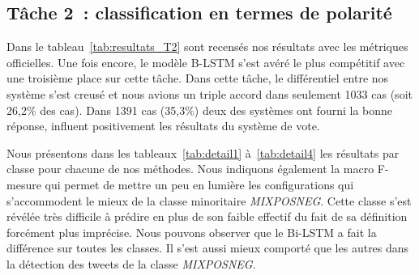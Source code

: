 \subsection{Tâche 2~: classification en termes de polarité}


Dans le tableau~\ref{tab:resultats_T2} sont recensés nos résultats avec les métriques officielles.
Une fois encore, le modèle B-LSTM s'est avéré le plus compétitif avec une troisième place sur cette tâche.
Dans cette tâche, le différentiel entre nos système s'est creusé et nous avions un triple accord dans seulement 1033 cas (soit 26,2\% des cas). Dans 1391 cas (35,3\%) deux des systèmes ont fourni la bonne réponse, influent positivement les résultats du système de vote.





Nous présentons dans les tableaux~\ref{tab:detail1} à~\ref{tab:detail4} les résultats par classe pour chacune de nos méthodes.
Nous indiquons également la macro F-mesure qui permet de mettre un peu en lumière les configurations qui s'accommodent le mieux de la classe minoritaire \emph{MIXPOSNEG}.
Cette classe s'est révélée très difficile à prédire en plus de son faible effectif du fait de sa définition forcément plus imprécise.
Nous pouvons observer que le Bi-LSTM a fait la différence sur toutes les classes.
Il s'est aussi mieux comporté que les autres dans la détection des tweets de la classe \emph{MIXPOSNEG}.

